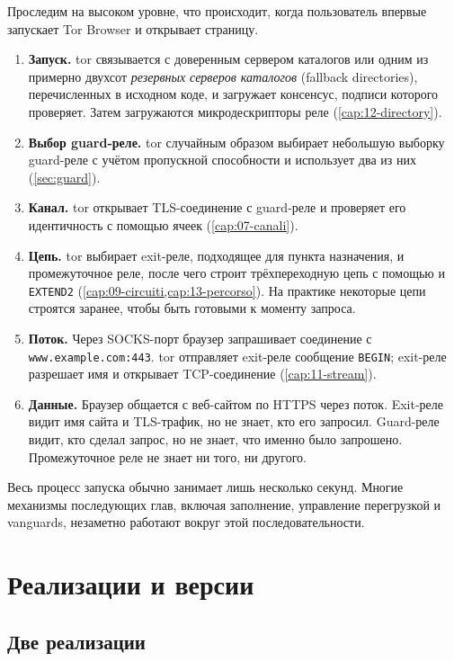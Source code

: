 Проследим на высоком уровне, что происходит, когда пользователь впервые запускает Tor Browser и открывает страницу.
\begin{enumerate}
  \item \textbf{Запуск.} tor связывается с доверенным сервером каталогов или одним из примерно двухсот \emph{резервных серверов каталогов} (fallback directories), перечисленных в исходном коде, и загружает консенсус, подписи которого проверяет. Затем загружаются микродескрипторы реле (\cref{cap:12-directory}).
  \item \textbf{Выбор guard-реле.} tor случайным образом выбирает небольшую выборку guard-реле с учётом пропускной способности и использует два из них (\cref{sec:guard}).
  \item \textbf{Канал.} tor открывает TLS-соединение с guard-реле и проверяет его идентичность с помощью ячеек  (\cref{cap:07-canali}).
  \item \textbf{Цепь.} tor выбирает exit-реле, подходящее для пункта назначения, и промежуточное реле, после чего строит трёхпереходную цепь с помощью  и \texttt{EXTEND2} (\cref{cap:09-circuiti,cap:13-percorso}). На практике некоторые цепи строятся заранее, чтобы быть готовыми к моменту запроса.
  \item \textbf{Поток.} Через SOCKS-порт браузер запрашивает соединение с \texttt{www.example.com:443}. tor отправляет exit-реле сообщение \texttt{BEGIN}; exit-реле разрешает имя и открывает TCP-соединение (\cref{cap:11-stream}).
  \item \textbf{Данные.} Браузер общается с веб-сайтом по HTTPS через поток. Exit-реле видит имя сайта и TLS-трафик, но не знает, кто его запросил. Guard-реле видит, кто сделал запрос, но не знает, что именно было запрошено. Промежуточное реле не знает ни того, ни другого.
\end{enumerate}
Весь процесс запуска обычно занимает лишь несколько секунд. Многие механизмы последующих глав, включая заполнение, управление перегрузкой и vanguards, незаметно работают вокруг этой последовательности.

\section{Реализации и версии}\label{sec:arch-versioni}

\subsection{Две реализации}

